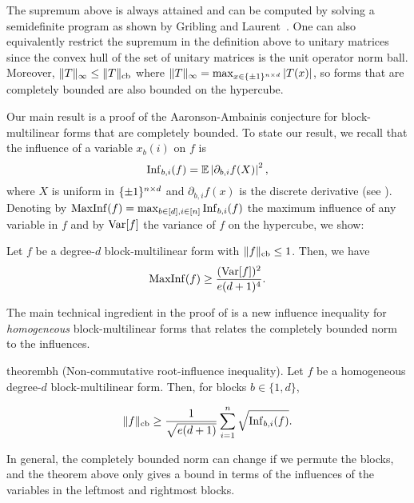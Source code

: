  The supremum above is always attained and can be computed by solving a semidefinite program as shown by Gribling and Laurent~\cite{GL19}. One can also equivalently restrict the supremum in the definition above to unitary matrices since the convex hull of the set of unitary matrices is the unit operator norm ball. Moreover, $\|T\|_{\infty} \le \|T\|_{\mathrm{cb}}$ where $\|T\|_{\infty} = \max_{x \in \{\pm 1\}^{n \times d}} |T(x)|$, so forms that are completely bounded  are also bounded on the hypercube. 

Our main result is a proof of the Aaronson-Ambainis conjecture for block-multilinear forms that are completely bounded. To state our result, we recall that the influence of a variable $x_b(i)$ on $f$ is
\[ \mathrm{Inf}_{b,i}(f) = \mathbb{E}\left| \partial_{b,i} f(X)\right|^2, \]
where $X$ is uniform in $\{\pm 1\}^{n \times d}$  and $\partial_{b,i}f(x)$ is the discrete derivative (see ). Denoting by $\mathrm{MaxInf}(f) = \max_{b \in [d],i \in [n]} \mathrm{Inf}_{b,i}(f)$ the maximum influence of any variable in $f$ and by $\mathrm{Var}[f]$ the variance of $f$ on the hypercube, we show: \\

\begin{theorem}\label{thm:aa}
     Let $f$ be a degree-$d$ block-multilinear form with $\|f\|_{\mathrm{cb}} \le 1$. Then, we have \[\mathrm{MaxInf}(f)  \ge \dfrac{(\mathrm{Var}[f])^2}{e(d+1)^4}.\]
\end{theorem} 
    
The main technical ingredient in the proof of  is a new influence inequality for \emph{homogeneous} block-multilinear forms that relates the completely bounded norm to the influences. 



\begin{restatable}{theorem}{bh}  {\rm (Non-commutative root-influence inequality).}
\label{thm:bh-intro}
Let $f$ be a homogeneous degree-$d$ block-multilinear form. Then, for blocks $b \in \{1,d\}$,


    \[ \|f\|_{\mathrm{cb}}  \ge \frac{1}{\sqrt{e(d+1)}} \sum_{i=1}^n \sqrt{\mathrm{Inf}_{b,i}(f)}. \]
\end{restatable}

 In general, the completely bounded norm can change if we permute the blocks, and the theorem above only gives a bound in terms of the influences of the variables in the leftmost and rightmost blocks.\\

